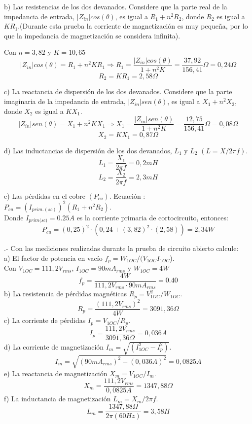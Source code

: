 \documentclass[12pt]{article}
\begin{document}
	b) Las resistencias de los dos devanados. Considere que la parte real de la impedancia de entrada, $|Z_{in}|cos(\theta)$, es igual a $R_{1} + n^2R_{2}$, donde $R_{2}$ es igual a $KR_{1}$.(Durante esta prueba la corriente de magnetización es muy pequeña, por lo	que la impedancia de magnetización se considera infinita).
	
	Con $n = 3,82$ y $K = 10,65$ $$|Z_{in}|cos(\theta) = R_{1} + n^2KR_{1} \Rightarrow R_{1} = \frac{|Z_{in}|cos(\theta)}{1 + n^2K} = \frac{37,92}{156,41} \Omega= 0,24\Omega$$ $$R_{2} = KR_{1} = 2,58 \Omega$$
	
	c) La reactancia de dispersión de los dos devanados. Considere que la parte imaginaria	de la impedancia de entrada, $|Z_{in}|sen(\theta)$, es igual a $X_{1} + n^2X_{2}$, donde $X_{2}$ es igual a $KX_{1}$. $$|Z_{in}|sen(\theta) = X_{1} + n^2KX_{1} \Rightarrow X_{1} = \frac{|Z_{in}|sen(\theta)}{1 + n^2K} = \frac{12,75}{156,41} \Omega = 0,08 \Omega$$ $$X_{2} = KX_{1} = 0,87 \Omega$$
	
	d) Las inductancias de dispersión de los dos devanados, $L_{1}$ y $L_{2}$ $(L = X/2 \pi f)$. $$L_{1} = \frac{X_{1}}{2\pi f} = 0,2 mH$$  $$L_{2} = \frac{X_{2}}{2\pi f} = 2,3 mH$$ 
	
	e) Las pérdidas en el cobre $(P_{cu})$. Ecuación : $P_{cu} = (I_{prim.(sc)})^2(R_{1} + n^2R_{2})$. \\
	
	Donde $I_{\textit{prim(sc)}} = 0.25A$ es la corriente primaria de cortocircuito, entonces: $$P_{cu} = (0,25)^2 \cdot (0,24 + (3,82)^2 \cdot (2,58)) = 2,34 W$$
	
	.- Con las mediciones realizadas durante la prueba de circuito abierto calcule:\\
	
	a) El factor de potencia en vacío $f_{p} = W_{1OC}/(V_{1OC} I_{1OC}$). \\
	
	Con $V_{1OC} = 111,2 V_{rms}$, $I_{1OC} = 90 m A_{rms}$ y $W_{1OC} = 4 W$
	$$f_{p} = \frac{4W}{111,2 V_{rms} \cdot 90 m A_{rms}} = 0.40$$
	b) La resistencia de pérdidas magnéticas $R_{p} = V_{1OC}^2 /W_{1OC}$. $$R_{p} = \frac{(111,2 V_{rms})^2}{4W} = 3091,36 \Omega$$
	c) La corriente de pérdidas $I_{p} = V_{1OC}/ R_{p}$. $$I_{p} = \frac{111,2 V_{rms}}{3091,36 \Omega} = 0,036 A$$
	d) La corriente de magnetización $I_{m} = \sqrt{(I_{1OC}^2 - I_{p}^2)}$. $$I_{m} = \sqrt{(90 m A_{rms})^2 - (0,036 A)^2} = 0,0825 A$$
	e) La reactancia de magnetización $X_{m} = V_{1OC}/ I_{m}$. $$X_{m} = \frac{111,2 V_{rms}}{0,0825 A} = 1347,88 \Omega$$
	f) La inductancia de magnetización $L_{m} = X_{m}/2\pi f$. $$L_{m} = \frac{1347,88 \Omega}{2\pi(60Hz)} = 3,58 H$$
	
\end{document}
